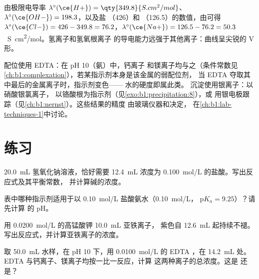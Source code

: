 由极限电导率 $\lambda^\circ(\ce{H+}) =
\qty{349.8}{S.cm^2/mol}$、$\lambda^\circ(\ce{OH-}) = 198.3$，以及盐
（426）和 （126.5）的数值，由可得
$\lambda^\circ(\ce{Cl-}) = 426 - 349.8 = 76.2$，$\lambda^\circ(\ce{Na+}) =
126.5 - 76.2 = 50.3$~\unit{S.cm^2/mol}。氢离子和氢氧根离子
的导电能力远强于其他离子：曲线呈尖锐的 V 形。

配位使用 EDTA：在 pH 10（氨）中，钙离子
和镁离子均与之（条件常数见
\cref{ch:b1:complexation}），若某指示剂本身是该金属的弱配位剂，
当 EDTA 夺取其中最后的金属离子时，指示剂变色——
水的硬度即属此类。
沉淀使用银离子：以硝酸银氯离子，
以铬酸根为指示剂（见\cref{exo:b1:precipitation:8}），或
用银电极跟踪（见\cref{ch:b1:nernst}）。这些结果的精度
由玻璃仪器和决定，
在\cref{ch:b1:lab-techniques-1}中讨论。

\section{练习}

\begin{exercise}[$\star$]\label{exo:b1:titration-methods:1}
\qty{20.0}{mL} 氢氧化钠溶液，恰好需要 \qty{12.4}{mL}
浓度为 \qty{0.100}{mol/L} 的盐酸。写出反应式及其平衡常数，
并计算碱的浓度。
\end{exercise}

\begin{exercise}[$\star$]\label{exo:b1:titration-methods:2}
表中哪种指示剂适用于以 \qty{0.10}{mol/L} 盐酸氨水（\qty{0.10}{mol/L}，
$\mathrm{p}K_a = 9.25$）？请先计算
的 pH。
\end{exercise}

\begin{exercise}[$\star$]\label{exo:b1:titration-methods:3}
用 \qty{0.0200}{mol/L} 的高锰酸钾 \qty{10.0}{mL} 亚铁离子，
紫色自 \qty{12.6}{mL} 起持续不褪。
写出反应式，并计算亚铁离子的浓度。
\end{exercise}

\begin{exercise}[$\star$]\label{exo:b1:titration-methods:4}
取 \qty{50.0}{mL} 水样，在 pH 10 下，用
\qty{0.0100}{mol/L} 的 EDTA ，在 \qty{14.2}{mL} 处。
EDTA 与钙离子、镁离子均按一比一反应，计算
这两种离子的总浓度。这是
还是？
\end{exercise}

